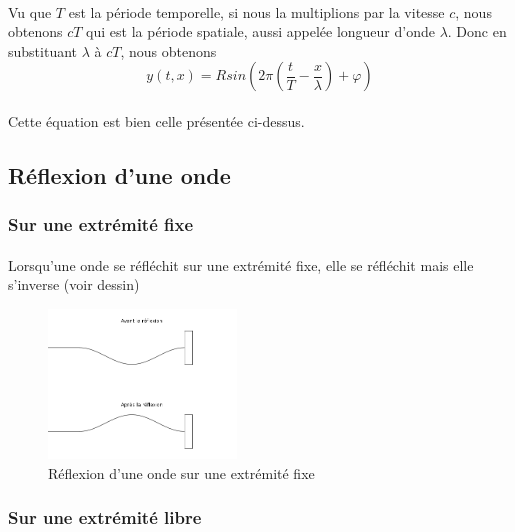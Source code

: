 \documentclass[a4paper]{article}
\begin{document}
\paragraph{}Vu que $T$ est la période temporelle, si nous la multiplions par la vitesse $c$, nous obtenons $cT$ qui est la période spatiale, aussi appelée longueur d'onde $\lambda$. Donc en substituant $\lambda$ à $cT$, nous obtenons
\[y(t,x)=Rsin\left(2\pi \left(\frac{t}{T}-\frac{x}{\lambda}\right)+\varphi\right)\]
\paragraph{}Cette équation est bien celle présentée ci-dessus.
\subsection{Réflexion d'une onde}
\subsubsection{Sur une extrémité fixe}
\paragraph{}Lorsqu'une onde se réfléchit sur une extrémité fixe, elle se réfléchit mais elle s'inverse (voir dessin)
\begin{figure}
\begin{center}
\includegraphics[width=5cm]{imgs/reflfixe.png}
\end{center}
\caption{Réflexion d'une onde sur une extrémité fixe}
\label{Réflexion d'une onde sur une extrémité fixe}
\end{figure}
\subsubsection{Sur une extrémité libre}
\end{document}
